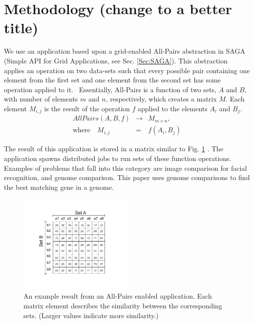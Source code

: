 \documentclass{rspublic}
\newcommand{\micnote}[1]{ {\textcolor{blue} { ***Michael: #1 }}}
\newcommand{\betynote}[1]{ {\textcolor{orange} { ***Bety: #1 }}}
\newcommand{\jhanote}[1]{} \newcommand{\micnote}[1]{}\newcommand{\betynote}[1]{} \newcommand{\fixme}[1]{}
\begin{document}
\section {Methodology (change to a better title)} We use an application
based upon a grid-enabled All-Pairs abstraction in SAGA (Simple API for
Grid Applications, see Sec. \ref{Sec:SAGA}). This abstraction applies an
operation on two data-sets such that every possible pair containing one
element from the first set and one element from the second set has some
operation applied to it.~\citep{Interop, AllPairs} \jhanote{which paper
is Interop?} Essentially,
All-Pairs is a function of two sets, $A$ and $B$, with number of
elements $m$ and $n$, respectively, which creates a matrix $M$. Each
element $M_{i,j}$ is the result of the operation $f$ applied to the
elements $A_i$ and $B_j$.
\begin{eqnarray}
 AllPairs(A, B, f) & \rightarrow & M_{m \times n}, \\
\mbox{where} \quad M_{i,j} & = & f(A_{i},B_{j})
 \end{eqnarray}

The result of this application is stored in a matrix similar to Fig.
\ref{Fig:AllPairsExplanation} . The application spawns distributed jobs
to run sets of these function operations.  Examples of problems that
fall into this category are image comparison for facial recognition, and
genome comparison. This paper uses genome comparisons to find the best
matching gene in a genome.

\begin{figure}[!ht]
 \begin{center}
     \includegraphics[width=0.50\textwidth]{data/allpairs-exp.pdf}
\end{center}
\caption{\small An example result from an All-Pairs enabled
application.  Each matrix element describes the similarity between
 the corresponding sets. (Larger values indicate more similarity.)}
 \label{Fig:AllPairsExplanation}
\end{figure}
\end{document}
